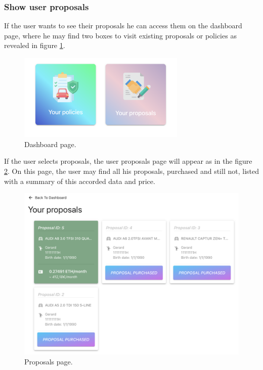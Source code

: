 \subsubsection{Show user proposals}
{
If the user wants to see their proposals he can access them on the dashboard page, where he may find two boxes to visit existing proposals or policies as revealed in figure \ref{fig:dashboard-page}.

\begin{figure}[H]
\centering
\includegraphics[width=8cm]{img/results/dashboard.png}
\caption[Insurechain: Dashboard page]{\footnotesize{Dashboard page.}}
\label{fig:dashboard-page}
\end{figure}

If the user selects proposals, the user proposals page will appear as in the figure \ref{fig:proposals-page}.
On this page, the user may find all his proposals, purchased and still not, listed with a summary of this accorded data and price.

\begin{figure}[H]
\centering
\includegraphics[width=12cm]{img/results/proposals-list.png}
\caption[Insurechain: Proposals page]{\footnotesize{Proposals page.}}
\label{fig:proposals-page}
\end{figure}

}
